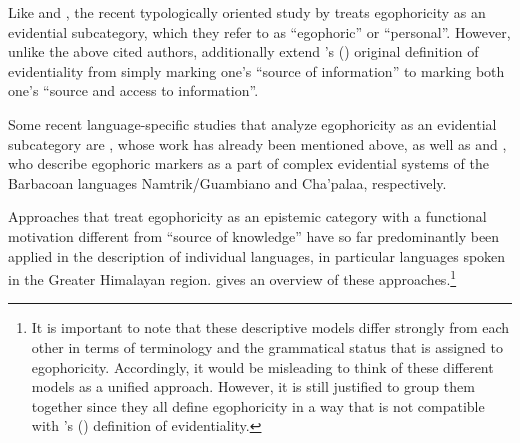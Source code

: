 \documentclass[output=paper]{langsci/langscibook}
\begin{document}
Like \cite{Plungian2010} and \cite{SanRoqueLoughnane2012}, the recent typologically oriented  study by \citet{TournadreLaPolla2014}  treats egophoricity as an evidential subcategory, which they refer to as “egophoric” or “personal”. However, unlike the above cited authors, \cite{TournadreLaPolla2014} additionally extend \citeauthor{Aikhenvald2004}’s (\citeyear{Aikhenvald2004}) original definition of evidentiality from simply marking one’s “source of information” to marking both one’s “source and access to information”.

Some recent language-specific studies that analyze egophoricity as an evidential subcategory are \cite{Loughnane2009}, whose work has already been mentioned above, as well as \cite{Norcliffe2018} and \cite{Floyd2018}, who describe egophoric markers as a part of complex evidential systems of the Barbacoan languages Namtrik{\slash}Guambiano and Cha’palaa, respectively.

Approaches that treat egophoricity as an epistemic category with a functional motivation different from “source of knowledge” have so far predominantly been applied in the description of individual languages, in particular languages spoken in the Greater Himalayan region.  gives an overview of these approaches.\footnote{It is important to note that these descriptive models differ strongly from each other in terms of terminology and the grammatical status that is assigned to egophoricity. Accordingly, it would be misleading to think of these different models as a unified approach. However, it is still justified to group them together since they all define egophoricity in a way that is not compatible with \citeauthor{Aikhenvald2004}’s (\citeyear{Aikhenvald2004}) definition of evidentiality.}
\end{document}
